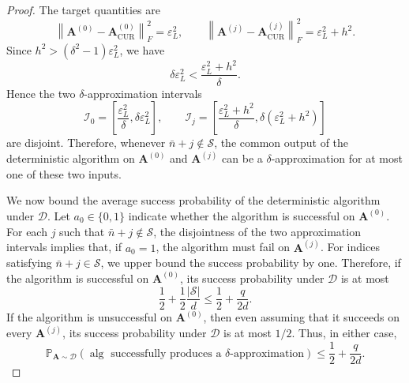 \documentclass[11pt]{article}
\begin{document}
\begin{proof}
    The target quantities are
    \begin{equation}
        \left\|
        \mathbf{A}^{(0)}-\mathbf{A}^{(0)}_{\mathrm{CUR}}
        \right\|_F^2
        =
        \varepsilon_L^2,
        \qquad
        \left\|
        \mathbf{A}^{(j)}-\mathbf{A}^{(j)}_{\mathrm{CUR}}
        \right\|_F^2
        =
        \varepsilon_L^2+h^2.
    \end{equation}
    Since
    $h^2>(\delta^2-1)\varepsilon_L^2$,
    we have
    \begin{equation}
        \delta\varepsilon_L^2
        <
        \frac{\varepsilon_L^2+h^2}{\delta}.
    \end{equation}
    Hence the two $\delta$-approximation intervals
    \begin{equation}
        \mathcal{I}_0
        =
        \left[
            \frac{\varepsilon_L^2}{\delta},
            \delta\varepsilon_L^2
            \right],
        \qquad
        \mathcal{I}_j
        =
        \left[
            \frac{\varepsilon_L^2+h^2}{\delta},
            \delta(\varepsilon_L^2+h^2)
            \right]
    \end{equation}
    are disjoint. Therefore, whenever $\bar n+j\notin\mathcal{S}$, the common
    output of the deterministic algorithm on $\mathbf{A}^{(0)}$ and
    $\mathbf{A}^{(j)}$ can be a $\delta$-approximation for at most one of these
    two inputs.

    We now bound the average success probability of the deterministic algorithm
    under $\mathcal{D}$. Let $a_0\in\{0,1\}$ indicate whether the algorithm is
    successful on $\mathbf{A}^{(0)}$. For each $j$ such that
    $\bar n+j\notin\mathcal{S}$, the disjointness of the two approximation
    intervals implies that, if $a_0=1$, the algorithm must fail on
    $\mathbf{A}^{(j)}$. For indices satisfying $\bar n+j\in\mathcal{S}$, we
    upper bound the success probability by one. Therefore, if the algorithm is
    successful on $\mathbf{A}^{(0)}$, its success probability under
    $\mathcal{D}$ is at most
    \begin{equation}
        \frac{1}{2}
        +
        \frac{1}{2}\frac{|\mathcal{S}|}{d}
        \leq
        \frac{1}{2}
        +
        \frac{q}{2d}.
    \end{equation}
    If the algorithm is unsuccessful on $\mathbf{A}^{(0)}$, then even assuming
    that it succeeds on every $\mathbf{A}^{(j)}$, its success probability under
    $\mathcal{D}$ is at most $1/2$. Thus, in either case,
    \begin{equation}
        \mathbb{P}_{\mathbf{A}\sim\mathcal{D}}
        \left(
        \operatorname{alg}\text{ successfully produces a }
        \delta\text{-approximation}
        \right)
        \leq
        \frac{1}{2}
        +
        \frac{q}{2d}.
    \end{equation}


\end{proof}
\end{document}
